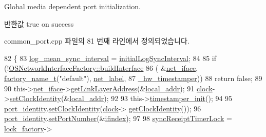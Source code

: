 Global media dependent port initialization. 

\begin{DoxyReturn}{반환값}
true on success 
\end{DoxyReturn}


common\+\_\+port.\+cpp 파일의 81 번째 라인에서 정의되었습니다.


\begin{DoxyCode}
82 \{
83     \hyperlink{class_common_port_ae72fee092f86e98847d8872b9fc5c1d5}{log\_mean\_sync\_interval} = \hyperlink{class_common_port_af64dc42272c346cc5f6f400c0e7d7088}{initialLogSyncInterval};
84 
85     \textcolor{keywordflow}{if} (!\hyperlink{class_o_s_network_interface_factory_a459ade6d7c1a3b8688bb8f982805077d}{OSNetworkInterfaceFactory::buildInterface}
86         ( &\hyperlink{class_common_port_a7bc95d8cb3e95a8e7f9c5dc261289e37}{net\_iface}, \hyperlink{classfactory__name__t}{factory\_name\_t}(\textcolor{stringliteral}{"default"}), 
      \hyperlink{class_common_port_a5885d7a835513edd0bbb0a170b4c9f01}{net\_label},
87           \hyperlink{class_common_port_a6b964d49ce26b21cc984b14102973f87}{\_hw\_timestamper}))
88         \textcolor{keywordflow}{return} \textcolor{keyword}{false};
89 
90     this->\hyperlink{class_common_port_a7bc95d8cb3e95a8e7f9c5dc261289e37}{net\_iface}->\hyperlink{class_o_s_network_interface_afa6f02e622bb5f5f1cbf9b0b21b50fe1}{getLinkLayerAddress}(&\hyperlink{class_common_port_af3d1546f688fbb9cec0317d152cab1da}{local\_addr});
91     \hyperlink{class_common_port_aa2bc8731fa5aeb5b033feebc2b67258c}{clock}->\hyperlink{class_i_e_e_e1588_clock_ab6d76a298f1d8c96481124095f2623cc}{setClockIdentity}(&\hyperlink{class_common_port_af3d1546f688fbb9cec0317d152cab1da}{local\_addr});
92 
93     this->\hyperlink{class_common_port_a64530a2fb5ad64bdc7e61b2e37791191}{timestamper\_init}();
94 
95     \hyperlink{class_common_port_a928a9e09d06b348120139e5cd2fcbcfe}{port\_identity}.\hyperlink{class_port_identity_abb9510d7ee3a171a6d55ab2cec30d3a6}{setClockIdentity}(\hyperlink{class_common_port_aa2bc8731fa5aeb5b033feebc2b67258c}{clock}->
      \hyperlink{class_i_e_e_e1588_clock_a56fd598a1dfd3bfe0658272544921162}{getClockIdentity}());
96     \hyperlink{class_common_port_a928a9e09d06b348120139e5cd2fcbcfe}{port\_identity}.\hyperlink{class_port_identity_a4278f191d797db9ab76799f43779498b}{setPortNumber}(&\hyperlink{class_common_port_af9eddbea0d06b00afe0a66dbe5371422}{ifindex});
97 
98     \hyperlink{class_common_port_af6298459c1a6d07a1e3538e4c5698e29}{syncReceiptTimerLock} = \hyperlink{class_common_port_a79c67e28bcaacaa0f11c04682d085b36}{lock\_factory}->

\end{DoxyCode}

